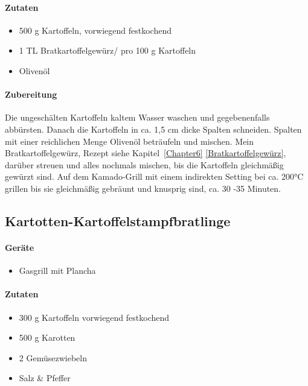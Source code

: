 \paragraph{Zutaten}

\begin{itemize}[noitemsep]
	\item 500 g Kartoffeln, vorwiegend festkochend
	\item 1 TL Bratkartoffelgewürz/ pro 100 g Kartoffeln
	\item Olivenöl
\end{itemize}

\paragraph{Zubereitung}

Die ungeschälten Kartoffeln kaltem Wasser waschen und gegebenenfalls abbürsten. Danach die Kartoffeln in ca. 1,5 cm dicke Spalten 
schneiden. Spalten mit einer reichlichen Menge Olivenöl beträufeln und mischen. Mein Bratkartoffelgewürz, Rezept siehe 
Kapitel~\ref{Chapter6} \vref{Bratkartoffelgewürz}, darüber streuen und alles nochmals mischen, bis die Kartoffeln gleichmäßig gewürzt sind. 
Auf dem Kamado-Grill mit einem indirekten Setting bei ca. 200°C grillen bis sie gleichmäßig gebräunt und knusprig sind, ca. 30 -35 Minuten.

\subsection{Kartotten-Kartoffelstampfbratlinge}

\paragraph{Geräte}

\begin{itemize}[noitemsep]
	\item 
	Gasgrill mit Plancha
\end{itemize}

\paragraph{Zutaten}

\begin{itemize}[noitemsep]
	\item 300 g Kartoffeln vorwiegend festkochend
	\item 500 g Karotten
	\item 2 Gemüsezwiebeln
	\item Salz \& Pfeffer 
\end{itemize}

